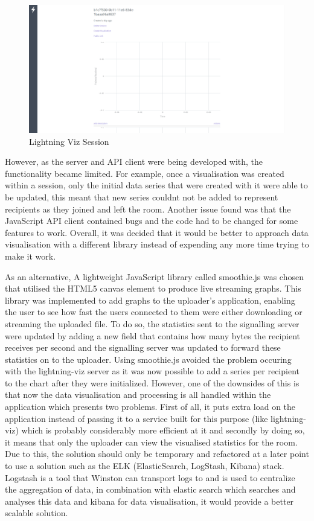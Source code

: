 \documentclass[]{report}
\begin{document}
				\begin{figure}[H]
					\caption{Lightning Viz Session}
					\centering
					\includegraphics[scale=0.25]{lightning-viz.png}
				\end{figure}	
				
				However, as the server and API client were being developed with, the functionality became limited. For example, once a visualisation was created within a session, only the initial data series that were created with it were able to be updated, this meant that new series couldnt not be added to represent recipients as they joined and left the room. Another issue found was that the JavaScript API client contained bugs and the code had to be changed for some features to work. Overall, it was decided that it would be better to approach data visualisation with a different library instead of expending any more time trying to make it work. 

				As an alternative, A lightweight JavaScript library called smoothie.js was chosen that utilised the HTML5 canvas element to produce live streaming graphs. This library was implemented to add graphs to the uploader's application, enabling the user to see how fast the users connected to them were either downloading or streaming the uploaded file. To do so, the statistics sent to the signalling server were updated by adding a new field that contains how many bytes the recipient receives per second and the signalling server was updated to forward these statistics on to the uploader. Using smoothie.js avoided the problem occuring with the lightning-viz server as it was now possible to add a series per recipient to the chart after they were initialized. However, one of the downsides of this is that now the data visualisation and processing is all handled within the application which presents two problems. First of all, it puts extra load on the application instead of passing it to a service built for this purpose (like lightning-viz) which is probably considerably more efficient at it and secondly by doing so, it means that only the uploader can view the visualised statistics for the room. Due to this, the solution should only be temporary and refactored at a later point to use a solution such as the ELK (ElasticSearch, LogStash, Kibana) stack. Logstash is a tool that Winston can transport logs to and is used to centralize the aggregation of data, in combination with elastic search which searches and analyses this data and kibana for data visualisation, it would provide a better scalable solution.
				
\end{document}
